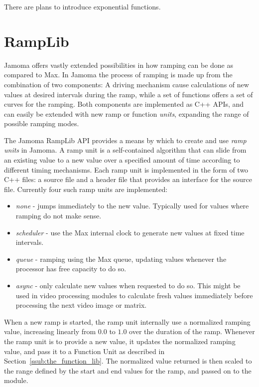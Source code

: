 \documentclass{article}
\begin{document}
There are plans to introduce exponential functions.



\section{RampLib}\label{sec:ramplib}

Jamoma offers vastly extended possibilities in how ramping can be done as compared to Max. In Jamoma the process of ramping is made up from the combination of two components: A driving mechanism cause calculations of new values at desired intervals during the ramp, while a set of functions offers a set of curves for the ramping. Both components are implemented as C++ APIs, and can easily be extended with new ramp or function \emph{units}, expanding the range of possible ramping modes.

The Jamoma RampLib API provides a means by which to create and use \emph{ramp units} in Jamoma.  A ramp unit is a self-contained algorithm that can slide from an existing value to a new value over a specified amount of time according to different timing mechanisms. Each ramp unit is implemented in the form of two C++ files: a source file and a header file that provides an interface for the source file. Currently four such ramp units are implemented:

\begin{itemize}
	\item \emph{none} - jumps immediately to the new value. Typically used for values where ramping do not make sense.
	\item \emph{scheduler} - use the Max internal clock to generate new values at fixed time intervals.
	\item \emph{queue} - ramping using the Max queue, updating values whenever the processor has free capacity to do so.
	\item \emph{async} - only calculate new values when requested to do so. This might be used in video processing modules to calculate fresh values immediately before processing the next video image or matrix.
\end{itemize}

When a new ramp is started, the ramp unit internally use a normalized ramping value, increasing linearly from $0.0$ to $1.0$ over the duration of the ramp. Whenever the ramp unit is to provide a new value, it updates the normalized ramping value, and pass it to a Function Unit as described in Section~\ref{ssub:the_function_lib}. The normalized value returned is then scaled to the range defined by the start and end values for the ramp, and passed on to the module.
\end{document}
